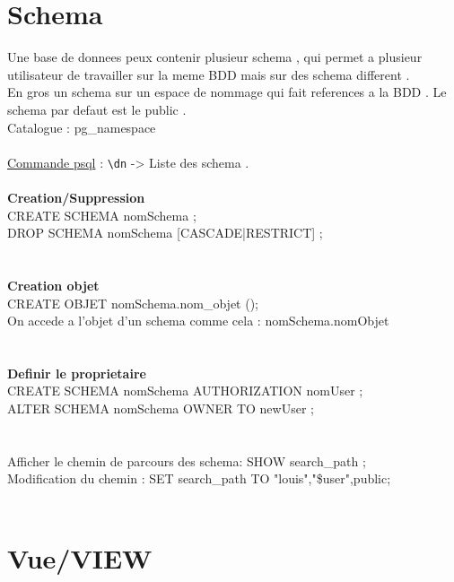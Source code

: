 \documentclass[a4paper,12pt,openany]{book}
\begin{document}
\section{Schema}
Une base de donnees peux contenir plusieur schema , qui permet a plusieur utilisateur de travailler sur la meme BDD mais sur des schema different .\\
En gros un schema sur un espace de nommage qui fait references a la BDD . Le schema par defaut est le public .\\
Catalogue : pg\_namespace \\
\\
\underline{Commande psql} : \verb+\dn+ -> Liste des schema .\\
\\
\textbf{Creation/Suppression}\\
CREATE SCHEMA nomSchema ; \\
DROP SCHEMA nomSchema [CASCADE|RESTRICT] ;\\
\\
\\
\textbf{Creation objet}\\
CREATE OBJET nomSchema.nom\_objet ();\\
On accede a l'objet d'un schema comme cela : nomSchema.nomObjet\\
\\
\\
\textbf{Definir le proprietaire}\\
CREATE SCHEMA nomSchema AUTHORIZATION nomUser ;\\
ALTER SCHEMA nomSchema OWNER TO newUser ; \\
\\
\\
Afficher le chemin de parcours des schema: SHOW search\_path ; \\
Modification du chemin : SET search\_path TO "louis","\$user",public;\\
\\

\section{Vue/VIEW}
\end{document}
